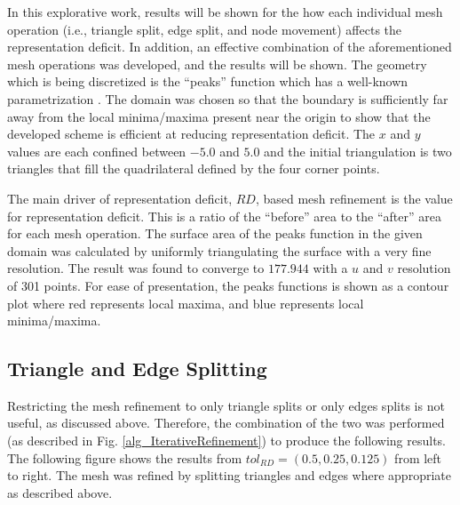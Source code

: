 In this explorative work, results will be shown for the how each
individual mesh operation (i.e., triangle split, edge split, and node 
movement) affects the representation deficit. In addition, an effective
combination of the aforementioned mesh operations was developed, and the
results will be shown. The geometry which is being discretized is the
``peaks'' function which has a well-known parametrization
\cite{peaksMatlab}. The domain was chosen so that the boundary is
sufficiently far away from the local minima/maxima present near the origin to
show that the developed scheme is efficient at reducing representation
deficit. The $x$ and $y$ values are each confined between $-5.0$ and
$5.0$ and the initial triangulation is two triangles that fill the
quadrilateral defined by the four corner points.

The main driver of representation deficit, $RD$, based mesh refinement
is the value for representation deficit. This is a ratio of the
``before'' area to the ``after'' area for each mesh operation. The
surface area of the peaks function in the given domain was calculated by
uniformly triangulating the surface with a very fine resolution. The
result was found to converge to $177.944$ with a $u$ and $v$ resolution
of 301 points. For ease of presentation, the peaks functions is shown as
a contour plot where red represents local maxima, and blue represents
local minima/maxima.

\subsection{Triangle and Edge Splitting}
Restricting the mesh refinement to only triangle splits or only edges
splits is not useful, as discussed above. Therefore, the combination of
the two was performed (as described in Fig. \ref{alg_IterativeRefinement})
to produce the following results. The following figure shows the results
from $tol_{RD}=\left(0.5,0.25,0.125\right)$ from left to right. The mesh was
refined by splitting triangles and edges where appropriate as described
above.

